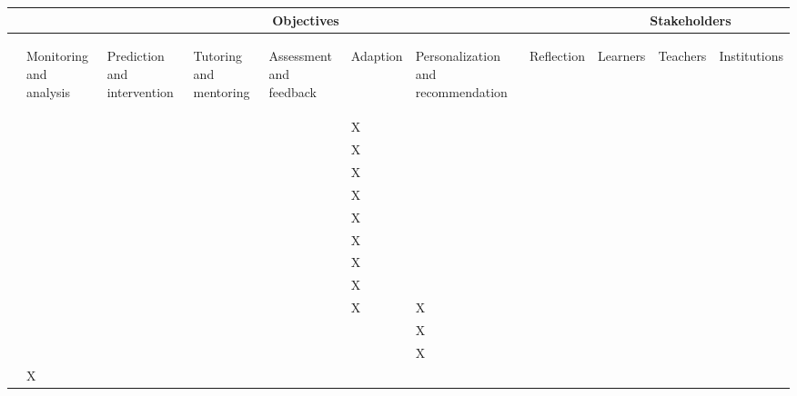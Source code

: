 \documentclass[11pt]{article}
\begin{document}
\begin{tabular}{l|lllllll|lll}
    & 
    \multicolumn{7}{c}{Objectives} &
    \multicolumn{3}{c}{Stakeholders} \\ 
\hline
    &
    \begin{sideways}Monitoring and analysis\end{sideways}&
    \begin{sideways}Prediction and intervention\end{sideways}&
    \begin{sideways}Tutoring and mentoring\end{sideways}&
    \begin{sideways}Assessment and feedback\end{sideways}&
    \begin{sideways}Adaption\end{sideways}&
    \begin{sideways}Personalization and recommendation\end{sideways}&
    \begin{sideways}Reflection\end{sideways}&
    \begin{sideways}Learners\end{sideways}&
    \begin{sideways}Teachers\end{sideways}&
    \begin{sideways}Institutions\end{sideways} \\ 
\hline
\cite{Brusilovsky2001}  &   &   &   &   & X &   &   \\ 
\cite{Brusilovsky2003}  &   &   &   &   & X &   &   \\ 
\cite{Brusilovsky2007}  &   &   &   &   & X &   &   \\ 
\cite{Weber2001}        &   &   &   &   & X &   &   \\
\cite{Henze2001}        &   &   &   &   & X &   &   \\
\cite{Farzan2004}       &   &   &   &   & X &   &   \\
\cite{Tang2005}         &   &   &   &   & X &   &   \\
\cite{Modritscher2011}  &   &   &   &   & X &   &   \\
\cite{Reategui2008}     &   &   &   &   & X & X &   \\
\cite{Modritscher2011}  &   &   &   &   &   & X &   \\
\cite{Tang2005}         &   &   &   &   &   & X &   \\
\cite{Mazza2004}        & X &   &   &   &   &   &   \\
\end{tabular}
\end{document}
